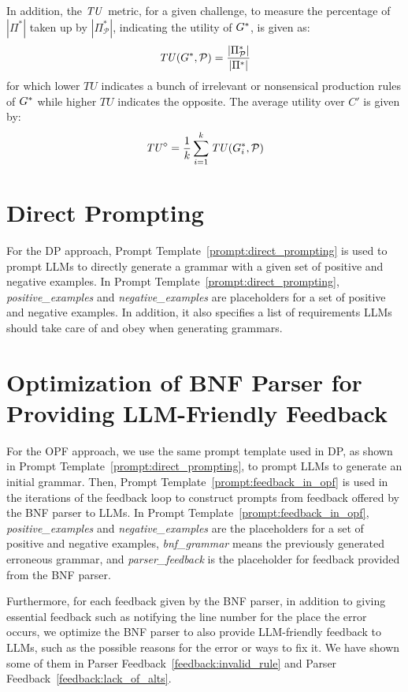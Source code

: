 In addition, the $\mathit{TU}$ metric, for a given challenge, to measure the percentage of $|\Pi^*|$ taken up by $|\Pi^*_\mathcal{P}|$, indicating the utility of $G^*$, is given as:
$$\mathit{TU}(G^*,\mathcal{P}) = \frac{|\Pi^*_\mathcal{P}|}{|\Pi^*|}$$ for which lower $TU$ indicates a bunch of irrelevant or nonsensical production rules of $G^*$ while higher $TU$ indicates the opposite. The average utility over $C'$ is given by:$$\mathit{TU}^\diamond = \frac{1}{k}\sum_{i=1}^{k} \mathit{TU}(G^*_i,\mathcal{P})$$

\section{Direct Prompting}
\label{appendix:DP}

For the DP approach, Prompt Template~\ref{prompt:direct_prompting} is used to prompt LLMs to directly generate a grammar with a given set of positive and negative examples. In Prompt Template~\ref{prompt:direct_prompting}, \textit{positive\_examples} and \textit{negative\_examples} are placeholders for a set of positive and negative examples. In addition, it also specifies a list of requirements LLMs should take care of and obey when generating grammars. 

\section{Optimization of BNF Parser for Providing LLM-Friendly Feedback}
\label{appendix:OPF}

For the OPF approach, we use the same prompt template used in DP, as shown in Prompt Template~\ref{prompt:direct_prompting}, to prompt LLMs to generate an initial grammar. Then, Prompt Template~\ref{prompt:feedback_in_opf} is used in the iterations of the feedback loop to construct prompts from feedback offered by the BNF parser to LLMs. In Prompt Template~\ref{prompt:feedback_in_opf}, \textit{positive\_examples} and \textit{negative\_examples} are the placeholders for a set of positive and negative examples, \textit{bnf\_grammar} means the previously generated erroneous grammar, and \textit{parser\_feedback} is the placeholder for feedback provided from the BNF parser.


Furthermore, for each feedback given by the BNF parser, in addition to giving essential feedback such as notifying the line number for the place the error occurs, we optimize the BNF parser to also provide LLM-friendly feedback to LLMs, such as the possible reasons for the error or ways to fix it. We have shown some of them in Parser Feedback~\ref{feedback:invalid_rule} and Parser Feedback~\ref{feedback:lack_of_alts}.


